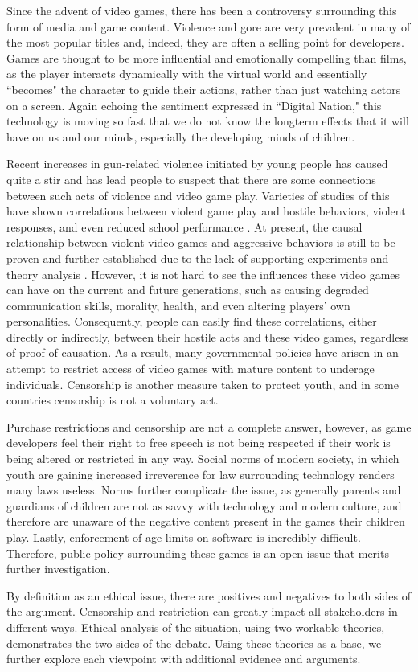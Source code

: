 

\indent\indent Since the advent of video games, there has been a controversy surrounding this form of media and game content. Violence and gore are very prevalent in many of the most popular titles and, indeed, they are often a selling point for developers. Games are thought to be more influential and emotionally compelling than films, as the player interacts dynamically with the virtual world and essentially ``becomes" the character to guide their actions, rather than just watching actors on a screen. Again echoing the sentiment expressed in ``Digital Nation," this technology is moving so fast that we do not know the longterm effects that it will have on us and our minds, especially the developing minds of children.

Recent increases in gun-related violence initiated by young people has caused quite a stir and has lead people to suspect that there are some connections between such acts of violence and video game play. Varieties of studies of this have shown correlations between violent game play and hostile behaviors, violent responses, and even reduced school performance \cite{barlett2009, gentile2004, anderson2003}. At present, the causal relationship between violent video games and aggressive behaviors is still to be proven and further established due to the lack of supporting experiments and theory analysis \cite{erguson2013, ferguson2008,makuch2013,markey2014}. However, it is not hard to see the influences these video games can have on the current and future generations, such as causing degraded communication skills, morality, health, and even altering players' own personalities. Consequently, people can easily find these correlations, either directly or indirectly, between their hostile acts and these video games, regardless of proof of causation. As a result, many governmental policies have arisen in an attempt to restrict access of video games with mature content to underage individuals. Censorship is another measure taken to protect youth, and in some countries censorship is not a voluntary act.

Purchase restrictions and censorship are not a complete answer, however, as game developers feel their right to free speech is not being respected if their work is being altered or restricted in any way. Social norms of modern society, in which youth are gaining increased irreverence for law surrounding technology renders many laws useless. Norms further complicate the issue, as generally parents and guardians of children are not as savvy with technology and modern culture, and therefore are unaware of the negative content present in the games their children play. Lastly, enforcement of age limits on software is incredibly difficult. Therefore, public policy surrounding these games is an open issue that merits further investigation.

By definition as an ethical issue, there are positives and negatives to both sides of the argument. Censorship and restriction can greatly impact all stakeholders in different ways. Ethical analysis of the situation, using two workable theories, demonstrates the two sides of the debate. Using these theories as a base, we further explore each viewpoint with additional evidence and arguments.